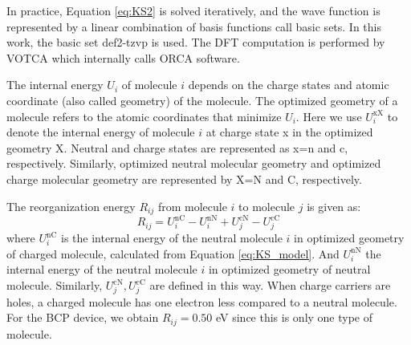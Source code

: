 \documentclass[letterpaper,12pt]{article}
\begin{document}
In practice, Equation \ref{eq:KS2} is solved iteratively, and the wave function is represented by a linear combination of basis functions call basic sets. 
In this work, the basic set def2-tzvp \cite{weigend_accurate_2006} is used. The DFT computation is performed by VOTCA \cite{Baumeier2011} which internally calls ORCA software.


The internal energy $U_i$ of molecule $i$ depends on the charge states and atomic coordinate (also called geometry) of the molecule. 
The optimized geometry of a molecule refers to the atomic coordinates that minimize $U_i$.
Here we use $U_i^\text{xX}$ to denote the internal energy of molecule $i$ at charge state x in the optimized geometry X. Neutral and charge states are represented as x=n and c, respectively. Similarly, optimized neutral molecular geometry and optimized charge molecular geometry are represented by X=N and C, respectively.

The reorganization energy $R_{ij}$ from molecule $i$ to molecule $j$ is given as:
\begin{equation}
    R_{ij} = U_i^\text{nC} - U_i^\text{nN} + U_j^\text{cN} - U_j^\text{cC}
\end{equation}
where $U_i^\text{nC}$ is the internal energy of the neutral molecule $i$ in optimized geometry of charged molecule, calculated from Equation \ref{eq:KS_model}. 
And $U_i^\text{nN}$ the internal energy of the neutral molecule $i$ in optimized geometry of neutral molecule. Similarly, $U_j^\text{cN}, U_j^\text{cC}$ are defined in this way.
When charge carriers are holes, a charged molecule has one electron less compared to a neutral molecule. 
For the BCP device, we obtain $R_{ij}=0.50$ eV since this is only one type of molecule.
\end{document}
